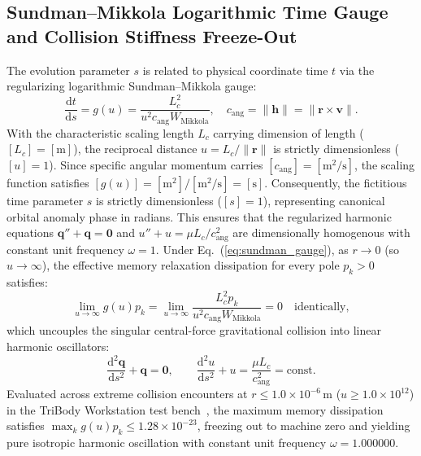 \documentclass[11pt,a4paper,reqno]{article}
\theoremstyle{plain}
\theoremstyle{definition}
\theoremstyle{remark}
\numberwithin{equation}{section}
\providecommand{\diff}{\mathrm{d}}
\begin{document}
\subsection{Sundman--Mikkola Logarithmic Time Gauge and Collision Stiffness Freeze-Out}
The evolution parameter $s$ is related to physical coordinate time $t$ via the regularizing logarithmic Sundman--Mikkola gauge:
\begin{equation}
\label{eq:sundman_gauge}
\frac{\diff t}{\diff s} = g(u) = \frac{L_c^2}{u^2 c_{\text{ang}} W_{\text{Mikkola}}}, \quad c_{\text{ang}} = \|\mathbf{h}\| = \|\mathbf{r} \times \mathbf{v}\|.
\end{equation}
With the characteristic scaling length $L_c$ carrying dimension of length ($[L_c] = [\mathrm{m}]$), the reciprocal distance $u = L_c / \|\bm{r}\|$ is strictly dimensionless ($[u] = 1$). Since specific angular momentum carries $[c_{\text{ang}}] = [\mathrm{m}^2/\mathrm{s}]$, the scaling function satisfies $[g(u)] = [\mathrm{m}^2]/[\mathrm{m}^2/\mathrm{s}] = [\mathrm{s}]$. Consequently, the fictitious time parameter $s$ is strictly dimensionless ($[s] = 1$), representing canonical orbital anomaly phase in radians. This ensures that the regularized harmonic equations $\mathbf{q}'' + \mathbf{q} = \mathbf{0}$ and $u'' + u = \mu L_c / c_{\text{ang}}^2$ are dimensionally homogenous with constant unit frequency $\omega = 1$.
Under Eq.~(\ref{eq:sundman_gauge}), as $r \to 0$ (so $u \to \infty$), the effective memory relaxation dissipation for every pole $p_k > 0$ satisfies:
\begin{equation}
\label{eq:freeze_out_proof}
\lim_{u \to \infty} g(u) p_k = \lim_{u \to \infty} \frac{L_c^2 p_k}{u^2 c_{\text{ang}} W_{\text{Mikkola}}} = 0 \quad \text{identically},
\end{equation}
which uncouples the singular central-force gravitational collision into linear harmonic oscillators:
\begin{equation}
\label{eq:harmonic_uncoupling}
\frac{\diff^2 \mathbf{q}}{\diff s^2} + \mathbf{q} = \mathbf{0}, \qquad \frac{\diff^2 u}{\diff s^2} + u = \frac{\mu L_c}{c_{\text{ang}}^2} = \text{const}.
\end{equation}
Evaluated across extreme collision encounters at $r \le 1.0 \times 10^{-6}\,\mathrm{m}$ ($u \ge 1.0 \times 10^{12}$) in the TriBody Workstation test bench~\cite{PillarXMonograph2026}, the maximum memory dissipation satisfies $\max_k g(u) p_k \le 1.28 \times 10^{-23}$, freezing out to machine zero and yielding pure isotropic harmonic oscillation with constant unit frequency $\omega = 1.000000$.
\end{document}
